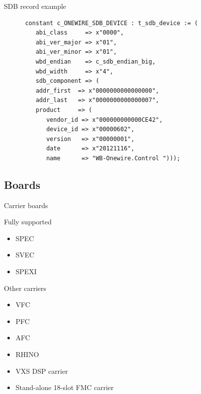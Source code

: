 \documentclass[compress,red]{beamer}
\begin{document}
\begin{frame}[fragile]{SDB record example}

    \begin{verbatim}
      constant c_ONEWIRE_SDB_DEVICE : t_sdb_device := (
         abi_class     => x"0000",
         abi_ver_major => x"01",
         abi_ver_minor => x"01",
         wbd_endian    => c_sdb_endian_big,
         wbd_width     => x"4",
         sdb_component => (
         addr_first  => x"0000000000000000",
         addr_last   => x"0000000000000007",
         product     => (
            vendor_id => x"000000000000CE42",
            device_id => x"00000602",
            version   => x"00000001",
            date      => x"20121116",
            name      => "WB-Onewire.Control ")));
    \end{verbatim}

\end{frame}

\subsection{Boards}

\begin{frame}{Carrier boards}

  \begin{block}{Fully supported}
    \begin{itemize}
    \item SPEC
    \item SVEC
    \item SPEXI
    \end{itemize}
  \end{block}

  \begin{block}{Other carriers}
    \begin{itemize}
    \item VFC
    \item PFC
    \item AFC
    \item RHINO
    \item VXS DSP carrier
    \item Stand-alone 18-slot FMC carrier
    \end{itemize}
  \end{block}

\end{frame}
\end{document}
